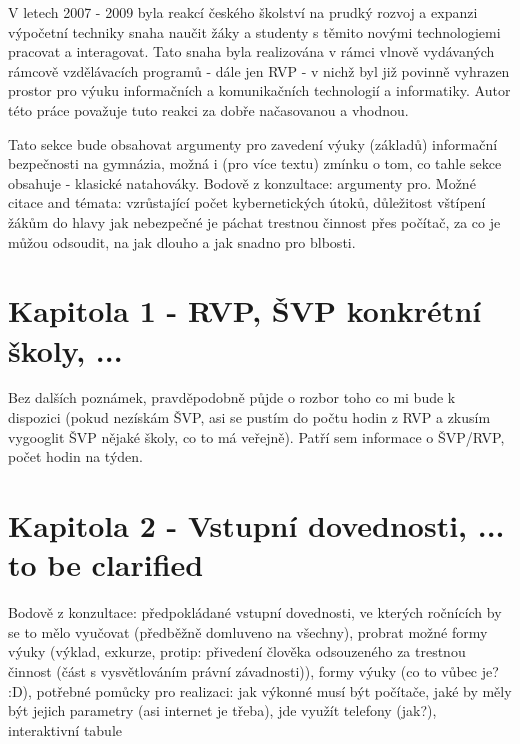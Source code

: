 \documentclass[a4paper, 11pt]{article}
\begin{document}

V letech 2007 \-- 2009 byla reakcí českého školství na prudký rozvoj a expanzi výpočetní techniky snaha naučit žáky a studenty s těmito novými technologiemi pracovat a interagovat. Tato snaha byla realizována v rámci vlnově vydávaných rámcově vzdělávacích programů \-- dále jen RVP \-- v nichž byl již povinně vyhrazen prostor pro výuku informačních a komunikačních technologií a informatiky. Autor této práce považuje tuto reakci za dobře načasovanou a vhodnou. %







% 



Tato sekce bude obsahovat argumenty pro zavedení výuky (základů) informační bezpečnosti na gymnázia, možná i (pro více textu) zmínku o tom, co tahle sekce obsahuje - klasické natahováky.
Bodově z konzultace: argumenty pro. 
Možné citace and témata: vzrůstající počet kybernetických útoků, důležitost vštípení žákům do hlavy jak nebezpečné je páchat trestnou činnost přes počítač, za co je můžou odsoudit, na jak dlouho a jak snadno pro blbosti.

\section{Kapitola 1 - RVP, ŠVP konkrétní školy, ...}
Bez dalších poznámek, pravděpodobně půjde o rozbor toho co mi bude k dispozici (pokud nezískám ŠVP, asi se pustím do počtu hodin z RVP a zkusím vygooglit ŠVP nějaké školy, co to má veřejně). Patří sem informace o ŠVP/RVP, počet hodin na týden.

\section{Kapitola 2 - Vstupní dovednosti, ... to be clarified}
Bodově z konzultace: předpokládané vstupní dovednosti, ve kterých ročnících by se to mělo vyučovat (předběžně domluveno na všechny), probrat možné formy výuky (výklad, exkurze, protip: přivedení člověka odsouzeného za trestnou činnost (část s vysvětlováním právní závadnosti)), formy výuky (co to vůbec je? :D), potřebné pomůcky pro realizaci: jak výkonné musí být počítače, jaké by měly být jejich parametry (asi internet je třeba), jde využít telefony (jak?), interaktivní tabule
\end{document}
